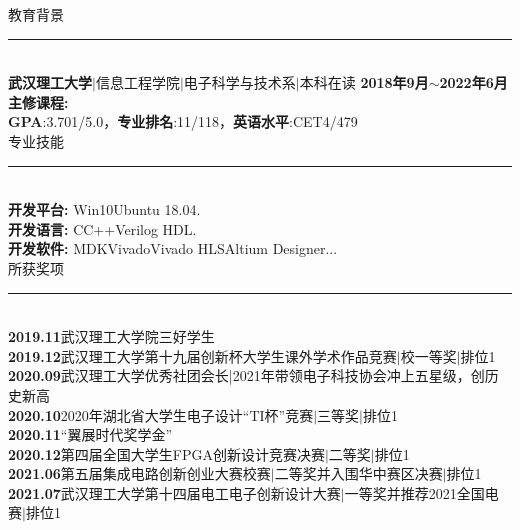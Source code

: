 \documentclass[UTF8]{ctexart}
\begin{document}
\noindent\faGraduationCap\quad 教育背景\\
\rule[12pt]{16cm}{0.005em}\\[-12pt]
\textbf{武汉理工大学}$\vert$信息工程学院$\vert$电子科学与技术系$\vert$本科在读
\hspace{3em} \textbf{2018年9月$\sim$2022年6月} \\
\textbf{主修课程:}\\
{\textbf{GPA}:3.701/5.0，}{\textbf{专业排名}:11/118，}{\textbf{英语水平}:CET4/479}\\[-10pt]

\noindent\faGears\quad 专业技能\\
\rule[12pt]{16cm}{0.005em}\\[-12pt]
\textbf{开发平台:}\hspace{1em} Win10\hspace{1em}Ubuntu 18.04.\\
\textbf{开发语言:}\hspace{1em} C\hspace{1em}C++\hspace{1em}Verilog HDL.\\
\textbf{开发软件:}\hspace{1em} MDK\hspace{1em}Vivado\hspace{1em}Vivado HLS\hspace{1em}Altium Designer...\\[-10pt]

\noindent\faTrophy\quad 所获奖项\\
\rule[12pt]{16cm}{0.005em}\\[-12pt]
\textbf{2019.11}\quad 武汉理工大学院三好学生\\
\textbf{2019.12}\quad 武汉理工大学第十九届创新杯大学生课外学术作品竞赛$\vert$校一等奖$\vert$排位1\\
\textbf{2020.09}\quad 武汉理工大学优秀社团会长|2021年带领电子科技协会冲上五星级，创历史新高\\
\textbf{2020.10}\quad 2020年湖北省大学生电子设计“TI杯”竞赛$\vert$三等奖$\vert$排位1\\
\textbf{2020.11}\quad “翼展时代奖学金”\\
\textbf{2020.12}\quad 第四届全国大学生FPGA创新设计竞赛决赛$\vert$二等奖$\vert$排位1\\
\textbf{2021.06}\quad 第五届集成电路创新创业大赛校赛$\vert$二等奖并入围华中赛区决赛$\vert$排位1\\
\textbf{2021.07}\quad 武汉理工大学第十四届电工电子创新设计大赛$\vert$一等奖并推荐2021全国电赛$\vert$排位1\\[-10pt]
\end{document}
